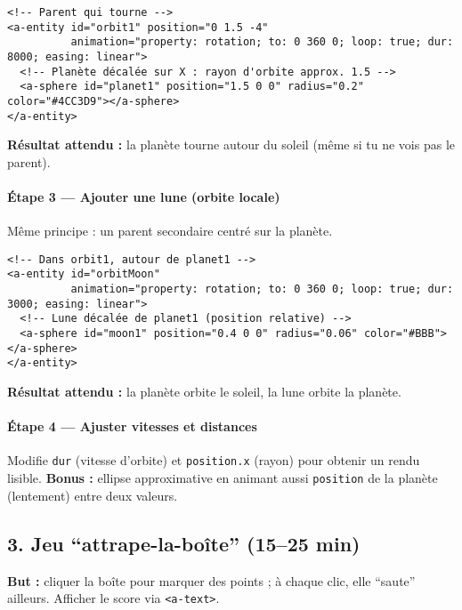\documentclass[12pt]{article}
\begin{document}
\begin{verbatim}
<!-- Parent qui tourne -->
<a-entity id="orbit1" position="0 1.5 -4"
          animation="property: rotation; to: 0 360 0; loop: true; dur: 8000; easing: linear">
  <!-- Planète décalée sur X : rayon d'orbite approx. 1.5 -->
  <a-sphere id="planet1" position="1.5 0 0" radius="0.2" color="#4CC3D9"></a-sphere>
</a-entity>
\end{verbatim}

\begin{checkpoint}
\textbf{Résultat attendu :} la planète tourne autour du soleil (même si tu ne vois pas le parent).
\end{checkpoint}

\paragraph{Étape 3 — Ajouter une lune (orbite locale)}
Même principe : un parent secondaire centré sur la planète.

\begin{verbatim}
<!-- Dans orbit1, autour de planet1 -->
<a-entity id="orbitMoon"
          animation="property: rotation; to: 0 360 0; loop: true; dur: 3000; easing: linear">
  <!-- Lune décalée de planet1 (position relative) -->
  <a-sphere id="moon1" position="0.4 0 0" radius="0.06" color="#BBB"></a-sphere>
</a-entity>
\end{verbatim}

\begin{checkpoint}
\textbf{Résultat attendu :} la planète orbite le soleil, la lune orbite la planète.
\end{checkpoint}

\paragraph{Étape 4 — Ajuster vitesses et distances}
Modifie \texttt{dur} (vitesse d’orbite) et \texttt{position.x} (rayon) pour obtenir un rendu lisible.  
\textbf{Bonus :} ellipse approximative en animant aussi \texttt{position} de la planète (lentement) entre deux valeurs.


\subsection*{3. Jeu “attrape-la-boîte” (15–25 min)}

\textbf{But :} cliquer la boîte pour marquer des points ; à chaque clic, elle “saute” ailleurs. Afficher le score via \texttt{<a-text>}.
\end{document}
